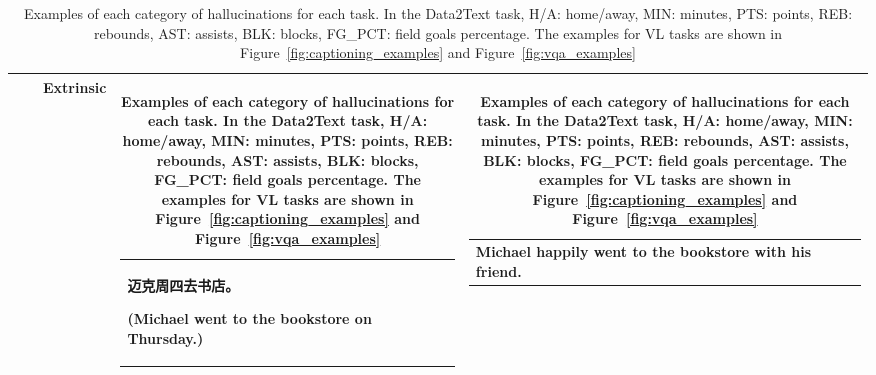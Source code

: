 \begin{table}
{\begin{tabular}{clclccccccl}
                              &                                                                                               & Extrinsic                & \multicolumn{7}{l}{\begin{tabularx}{0.35\textwidth}{X}\begin{CJK*}{UTF8}{gbsn}迈克周四去书店。\end{CJK*} (Michael went to the bookstore on Thursday.) \end{tabularx}}                                                                                                                                                                                                                                                                                                                 & \begin{tabularx}{0.35\textwidth}{X}Michael \textbf{happily} went to the bookstore \textbf{with his friend.} \end{tabularx}                                                                                                                                                                         \\ \bottomrule
\end{tabular}
}
\caption{Examples of each category of hallucinations for each task.
 In the Data2Text task, H/A: home/away, MIN: minutes, PTS: points, REB: rebounds, AST: assists, BLK: blocks, FG\_PCT: field goals percentage. The examples for VL tasks are shown in Figure~\ref{fig:captioning_examples} and Figure~\ref{fig:vqa_examples}}
\label{Table: example}
\end{table}
